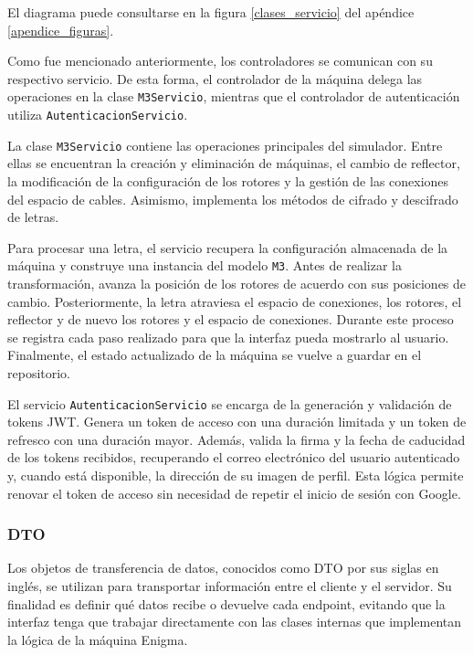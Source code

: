 El diagrama puede consultarse en la figura \ref{clases_servicio} del apéndice \ref{apendice_figuras}.

Como fue mencionado anteriormente, los controladores se comunican con su respectivo servicio. De esta forma, el controlador de la máquina delega las operaciones en la clase \texttt{M3Servicio}, mientras que el controlador de autenticación utiliza \texttt{AutenticacionServicio}.

La clase \texttt{M3Servicio} contiene las operaciones principales del simulador. Entre ellas se encuentran la creación y eliminación de máquinas, el cambio de reflector, la modificación de la configuración de los rotores y la gestión de las conexiones del espacio de cables. Asimismo, implementa los métodos de cifrado y descifrado de letras.

Para procesar una letra, el servicio recupera la configuración almacenada de la máquina y construye una instancia del modelo \texttt{M3}. Antes de realizar la transformación, avanza la posición de los rotores de acuerdo con sus posiciones de cambio. Posteriormente, la letra atraviesa el espacio de conexiones, los rotores, el reflector y de nuevo los rotores y el espacio de conexiones. Durante este proceso se registra cada paso realizado para que la interfaz pueda mostrarlo al usuario. Finalmente, el estado actualizado de la máquina se vuelve a guardar en el repositorio.

El servicio \texttt{AutenticacionServicio} se encarga de la generación y validación de tokens JWT. Genera un token de acceso con una duración limitada y un token de refresco con una duración mayor. Además, valida la firma y la fecha de caducidad de los tokens recibidos, recuperando el correo electrónico del usuario autenticado y, cuando está disponible, la dirección de su imagen de perfil. Esta lógica permite renovar el token de acceso sin necesidad de repetir el inicio de sesión con Google. 

\subsubsection{DTO}

Los objetos de transferencia de datos, conocidos como DTO por sus siglas en inglés, se utilizan para transportar información entre el cliente y el servidor. Su finalidad es definir qué datos recibe o devuelve cada endpoint, evitando que la interfaz tenga que trabajar directamente con las clases internas que implementan la lógica de la máquina Enigma.

